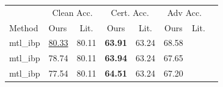 \begin{tabular}{llcccccc}
\toprule
 & \multicolumn{2}{c}{Clean Acc.} & \multicolumn{2}{c}{Cert. Acc.} & \multicolumn{2}{c}{Adv Acc.} \\
Method & Ours & Lit. & Ours & Lit. & Ours & Lit. \\
\midrule
mtl\_ibp & \underline{80.33} & 80.11 & \textbf{63.91} & 63.24 & 68.58 & \\
mtl\_ibp & 78.74 & 80.11 & \textbf{63.94} & 63.24 & 67.65 & \\
mtl\_ibp & 77.54 & 80.11 & \textbf{64.51} & 63.24 & 67.20 & \\
\bottomrule
\end{tabular}